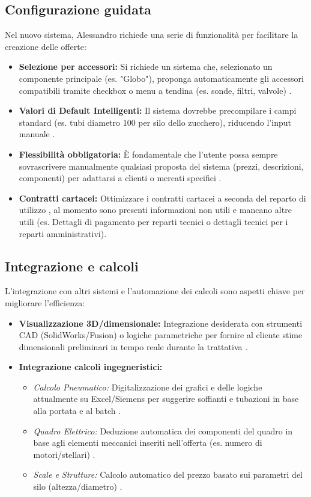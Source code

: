 \documentclass[12pt, a4paper]{article} %
\begin{document}
\subsection{Configurazione guidata}
Nel nuovo sistema, Alessandro richiede una serie di funzionalità per facilitare la creazione delle offerte:
\begin{itemize}
      \item \textbf{Selezione per accessori:} Si richiede un sistema che, selezionato un componente principale (es. "Globo"),
            proponga automaticamente gli accessori compatibili tramite checkbox o menu a tendina (es. sonde, filtri, valvole) .
      \item \textbf{Valori di Default Intelligenti:} Il sistema dovrebbe precompilare i campi standard (es. tubi diametro 100 per silo dello zucchero),
            riducendo l'input manuale .
      \item \textbf{Flessibilità obbligatoria:} È fondamentale che l'utente possa sempre sovrascrivere manualmente qualsiasi proposta del sistema (prezzi, descrizioni, componenti)
            per adattarsi a clienti o mercati specifici .
      \item \textbf{Contratti cartacei:} Ottimizzare i contratti cartacei a seconda del reparto di utilizzo , al momento sono presenti
            informazioni non utili e mancano altre utili (es. Dettagli di pagamento per reparti tecnici o dettagli tecnici per i reparti amministrativi).
\end{itemize}

\subsection{Integrazione e calcoli}
L'integrazione con altri sistemi e l'automazione dei calcoli sono aspetti chiave per migliorare l'efficienza:
\begin{itemize}
      \item \textbf{Visualizzazione 3D/dimensionale:} Integrazione desiderata con strumenti CAD (SolidWorks/Fusion)
            o logiche parametriche per fornire al cliente stime dimensionali preliminari in tempo reale durante la trattativa .
      \item \textbf{Integrazione calcoli ingegneristici:}
            \begin{itemize}
                  \item \textit{Calcolo Pneumatico:} Digitalizzazione dei grafici e delle logiche attualmente su Excel/Siemens per suggerire soffianti
                        e tubazioni in base alla portata e al batch .
                  \item \textit{Quadro Elettrico:} Deduzione automatica dei componenti del quadro in base agli elementi meccanici inseriti nell'offerta (es. numero di motori/stellari) .
                  \item \textit{Scale e Strutture:} Calcolo automatico del prezzo basato sui parametri del silo (altezza/diametro) .
            \end{itemize}
\end{itemize}
\end{document}
